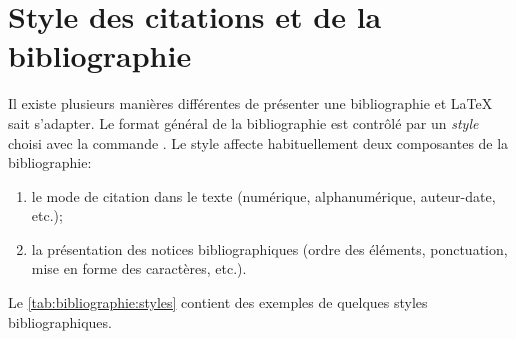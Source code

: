 


\section{Style des citations et de la bibliographie}
\label{sec:bibliographie:style}

Il existe plusieurs manières différentes de présenter une
bibliographie et {\LaTeX} sait s'adapter. Le format général de la
bibliographie est contrôlé par un \emph{style} choisi avec la commande
\cmd{}. Le style affecte habituellement deux
composantes de la bibliographie:
\begin{enumerate}
\item le mode de citation dans le texte (numérique, alphanumérique,
  auteur-date, etc.);
\item la présentation des notices bibliographiques (ordre des
  éléments, ponctuation, mise en forme des caractères, etc.).
\end{enumerate}
Le \autoref{tab:bibliographie:styles} contient des exemples de
quelques styles bibliographiques.

